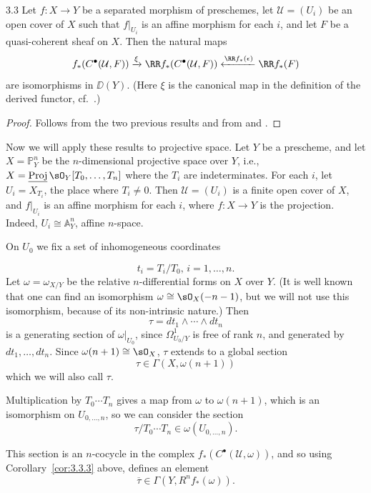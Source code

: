 \begin{bookcorollary}{3.3}\label{cor:3.3.3}
Let $f\colon X\to Y$ be a separated morphism of preschemes, let $\mathcal{U}=(U_i)$ be an open cover of $X$ such that $f|_{U_i}$ is an affine morphism for each $i$, and let $F$ be a quasi-coherent sheaf on $X$. Then the natural maps
\[
f_*(C^\bullet(\mathcal{U},F)) \xrightarrow{\xi} \RR f_*(C^\bullet(\mathcal{U},F)) \xleftarrow{\RR f_*(\epsilon)} \RR f_*(F)
\]
are isomorphisms in $\DD(Y)$. (Here $\xi$ is the canonical map in the definition of the derived functor, cf.\ .)
\end{bookcorollary}

\begin{proof}
Follows from the two previous results and from  and .
\end{proof}

Now we will apply these results to projective space. Let $Y$ be a prescheme, and let $X=\mathbb{P}^n_Y$ be the $n$-dimensional projective space over $Y$, i.e., $X=\underline{\operatorname{Proj}}\,\sO_Y[T_0,\dots,T_n]$ where the $T_i$ are indeterminates. For each $i$, let $U_i=X_{T_i}$, the place where $T_i\neq 0$. Then $\mathcal{U}=(U_i)$ is a finite open cover of $X$, and $f|_{U_i}$ is an affine morphism for each $i$, where $f\colon X\to Y$ is the projection. Indeed, $U_i\cong\mathbb{A}^n_Y$, affine $n$-space.

On $U_0$ we fix a set of inhomogeneous coordinates

\[t_i=T_i/T_0,\, i=1,\dots,n.
\]
Let $\omega=\omega_{X/Y}$ be the relative $n$-differential forms on $X$ over $Y$. (It is well known that one can find an isomorphism $\omega\cong\sO_X(-n-1)$, but we will not use this isomorphism, because of its non-intrinsic nature.) Then
\[
\tau = dt_1\wedge\cdots\wedge dt_n
\]
is a generating section of $\omega|_{U_0}$, since $\Omega^1_{U_0/Y}$ is free of rank $n$, and generated by $dt_1,\dots,dt_n$. Since $\omega(n+1)\cong\sO_X$, $\tau$ extends to a global section
\[
\tau \in \Gamma(X,\omega(n+1))
\]
which we will also call $\tau$.

Multiplication by $T_0\cdots T_n$ gives a map from $\omega$ to $\omega(n+1)$, which is an isomorphism on $U_{0,\dots,n}$, so we can consider the section
\[
\tau/T_0\cdots T_n \in \omega(U_{0,\dots,n}).
\]

This section is an $n$-cocycle in the complex $f_*(C^\bullet(\mathcal{U},\omega))$, and so using Corollary~\ref{cor:3.3.3} above, defines an element
\[
\overline{\tau} \in \Gamma(Y,R^n f_*(\omega)).
\]

